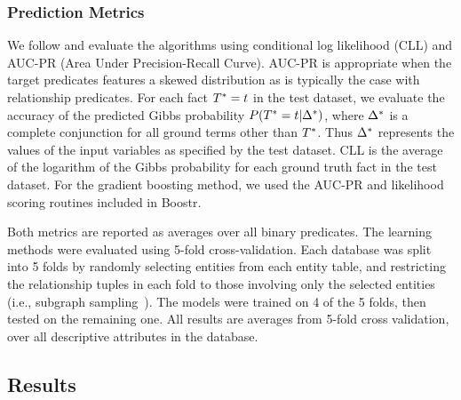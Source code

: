 \documentclass[runningheads,a4paper]{llncs}
\begin{document}
\subsubsection{Prediction Metrics}
We follow \cite{Khot2011} and evaluate the algorithms using conditional log likelihood (CLL) and AUC-PR (Area Under Precision-Recall Curve). AUC-PR is appropriate when the target predicates features a skewed distribution as is typically the case with relationship predicates. %
For each fact $T^{*}\hspace{0.0ex} = t$ in the test dataset, we evaluate the accuracy of the predicted Gibbs probability $P(T^{*}\hspace{0.0ex} = t | \Delta^{*}\hspace{0.0ex})$, where $\Delta^{*}\hspace{0.0ex}$ is a complete conjunction for all ground terms other than $T^{*}\hspace{0.0ex}$. Thus $\Delta^{*}\hspace{0.0ex}$ represents the values of the input variables as specified by the test dataset.
CLL is the average of the logarithm of the Gibbs probability for each ground truth fact in the test dataset. For the gradient boosting method, we used the AUC-PR and likelihood scoring routines included in Boostr.


Both metrics are reported as averages over all binary predicates. The learning methods were evaluated using 5-fold cross-validation. Each database was split into 5 folds by randomly selecting entities from each entity table, and restricting the relationship tuples in each fold to those involving only the selected entities  (i.e., subgraph sampling~\cite{Schulte2012}). The models were trained on 4 of the 5 folds, then tested on the remaining one. All results are averages from 5-fold cross validation, over all descriptive attributes in the database. 


\subsection{Results} 
\end{document}
